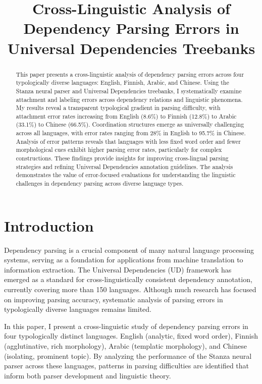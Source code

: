 \documentclass[11pt]{article}
\title{\textbf{Cross-Linguistic Analysis of Dependency Parsing Errors in Universal Dependencies Treebanks }}
\begin{document}
\maketitle
\begin{abstract}
This paper presents a cross-linguistic analysis of dependency parsing errors across four typologically diverse languages: English, Finnish, Arabic, and Chinese. Using the Stanza neural parser and Universal Dependencies treebanks, I systematically examine attachment and labeling errors across dependency relations and linguistic phenomena. My results reveal a transparent typological gradient in parsing difficulty, with attachment error rates increasing from English (8.6\%) to Finnish (12.8\%) to Arabic (33.1\%) to Chinese (66.5\%). Coordination structures emerge as universally challenging across all languages, with error rates ranging from 28\% in English to 95.7\% in Chinese. Analysis of error patterns reveals that languages with less fixed word order and fewer morphological cues exhibit higher parsing error rates, particularly for complex constructions. These findings provide insights for improving cross-lingual parsing strategies and refining Universal Dependencies annotation guidelines. The analysis demonstrates the value of error-focused evaluations for understanding the linguistic challenges in dependency parsing across diverse language types.
\end{abstract}

\section{Introduction}

Dependency parsing is a crucial component of many natural language processing systems, serving as a foundation for applications from machine translation to information extraction. The Universal Dependencies (UD) framework has emerged as a standard for cross-linguistically consistent dependency annotation, currently covering more than 150 languages. Although much research has focused on improving parsing accuracy, systematic analysis of parsing errors in typologically diverse languages remains limited.

In this paper, I present a cross-linguistic study of dependency parsing errors in four typologically distinct languages. English (analytic, fixed word order), Finnish (agglutinative, rich morphology), Arabic (templatic morphology), and Chinese (isolating, prominent topic). By analyzing the performance of the Stanza neural parser across these languages, patterns in parsing difficulties are identified that inform both parser development and linguistic theory.
\end{document}
